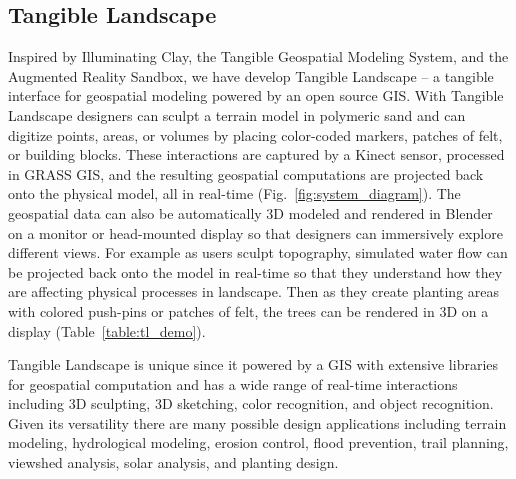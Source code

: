 \documentclass[Afour,sagev,times]{sagej} %
\begin{document}
\subsection{Tangible Landscape}
Inspired by Illuminating Clay, 
the Tangible Geospatial Modeling System, 
\cite{Mitasova2006,Tateosian2010} 
and the Augmented Reality Sandbox, 
we have develop Tangible Landscape 
-- a tangible interface for geospatial modeling
powered by an open source GIS. \cite{Petrasova2015}
With Tangible Landscape
designers can sculpt a terrain model in polymeric sand
and can digitize points, areas, or volumes by placing 
color-coded markers, patches of felt, or building blocks. 
These interactions are captured by a Kinect sensor, 
processed in GRASS GIS, 
and the resulting geospatial computations
are projected back onto the physical model, 
all in real-time (Fig.~\ref{fig:system_diagram}).
The geospatial data can also be automatically
3D modeled and rendered in Blender 
on a monitor or head-mounted display
so that designers can 
immersively explore different views. \cite{Tabrizian2016}
For example
as users sculpt topography,
simulated water flow can be projected back onto the model in real-time
so that they understand how they are affecting 
physical processes in landscape.
Then as they create planting areas 
with colored push-pins or patches of felt,
the trees can be rendered in 3D on a display
(Table~\ref{table:tl_demo}). 

Tangible Landscape is unique since it powered by a GIS
with extensive libraries for geospatial computation
and has a wide range of real-time interactions including 
3D sculpting, 3D sketching, color recognition, and object recognition.
Given its versatility there are many possible design applications
including terrain modeling, hydrological modeling, erosion control, 
flood prevention, trail planning, viewshed analysis, solar analysis, 
and planting design. 
\end{document}
